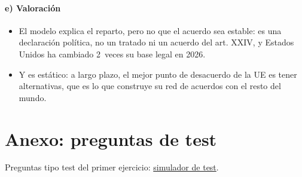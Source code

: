 \documentclass[11pt]{article}
\begin{document}
\paragraph{e) Valoración}

\begin{itemize}
\item El modelo explica el reparto, pero no que el acuerdo sea estable: es una declaración política, no un tratado ni un acuerdo del art. XXIV, y Estados Unidos ha cambiado 2~veces su base legal en 2026.
\item Y es estático: a largo plazo, el mejor punto de desacuerdo de la UE es tener alternativas, que es lo que construye su red de acuerdos con el resto del mundo.
\end{itemize}

\section{Anexo: preguntas de test}\label{anexo:test}

\begin{anotaciones}
Preguntas tipo test del primer ejercicio: \href{https://www.victorgutierrezmarcos.es/oposicion/temario/primer-ejercicio/test/simulador.html?tema=3.B.41}{simulador de test}.
\end{anotaciones}

\bibliografia
\end{document}
